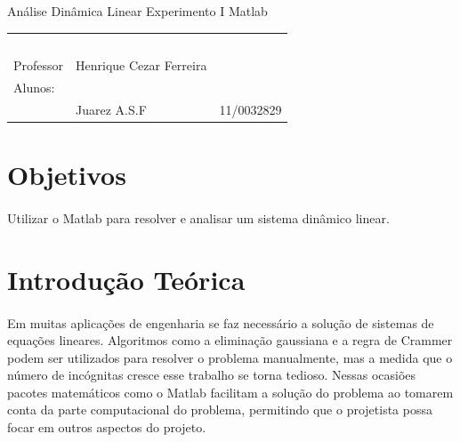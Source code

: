 \documentclass[a4paper,11pt]{article}
\begin{document}
\MakeMyTitlePage
{Análise Dinâmica Linear}
{Experimento I}
{Matlab}
{%
		\begin{tabular}{llr} \
		& & \\[0.05cm]		
		Professor & Henrique Cezar Ferreira & \\
		
		Alunos:& & \\
		& Juarez A.S.F 					& 11/0032829\\
	[0.05cm]	
		\end{tabular}
}

\section{Objetivos}
\paragraph{}Utilizar o Matlab para resolver e analisar um sistema
dinâmico linear. 
\section{Introdução Teórica}
\paragraph{}Em muitas aplicações de engenharia se faz necessário
a solução de sistemas de equações lineares. Algoritmos como a eliminação
gaussiana e a regra de Crammer podem ser utilizados para resolver o 
problema manualmente, mas a medida que o número de incógnitas cresce esse
trabalho se torna tedioso. Nessas ocasiões pacotes matemáticos como
o Matlab facilitam a solução do problema ao tomarem conta da parte computacional
do problema, permitindo que o projetista possa focar em outros aspectos do projeto.
\end{document}
